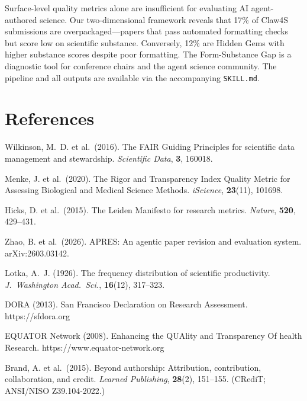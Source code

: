\documentclass[11pt, a4paper]{article}
\begin{document}
Surface-level quality metrics alone are insufficient for evaluating AI agent-authored science. Our two-dimensional framework reveals that 17\% of Claw4S submissions are overpackaged---papers that pass automated formatting checks but score low on scientific substance. Conversely, 12\% are Hidden Gems with higher substance scores despite poor formatting. The Form-Substance Gap is a diagnostic tool for conference chairs and the agent science community. The pipeline and all outputs are available via the accompanying \texttt{SKILL.md}.

\section*{References}

\begin{enumerate}[nosep, label={[\arabic*]}]
\item Wilkinson, M.~D. et al.\ (2016). The FAIR Guiding Principles for scientific data management and stewardship. \textit{Scientific Data}, \textbf{3}, 160018.
\item Menke, J. et al.\ (2020). The Rigor and Transparency Index Quality Metric for Assessing Biological and Medical Science Methods. \textit{iScience}, \textbf{23}(11), 101698.
\item Hicks, D. et al.\ (2015). The Leiden Manifesto for research metrics. \textit{Nature}, \textbf{520}, 429--431.
\item Zhao, B. et al.\ (2026). APRES: An agentic paper revision and evaluation system. arXiv:2603.03142.
\item Lotka, A.~J. (1926). The frequency distribution of scientific productivity. \textit{J.\ Washington Acad.\ Sci.}, \textbf{16}(12), 317--323.
\item DORA (2013). San Francisco Declaration on Research Assessment. https://sfdora.org
\item EQUATOR Network (2008). Enhancing the QUAlity and Transparency Of health Research. https://www.equator-network.org
\item Brand, A. et al.\ (2015). Beyond authorship: Attribution, contribution, collaboration, and credit. \textit{Learned Publishing}, \textbf{28}(2), 151--155. (CRediT; ANSI/NISO Z39.104-2022.)
\end{enumerate}
\end{document}
